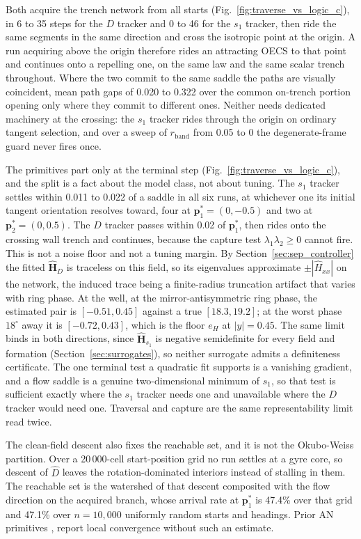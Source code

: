 \documentclass[lettersize,journal]{IEEEtran}
\begin{document}
Both acquire the trench network from all starts
(Fig.~\ref{fig:traverse_vs_logic_c}), in 6 to 35 steps for the $D$
tracker and 0 to 46 for the $s_1$ tracker, then ride the same segments
in the same direction and cross the isotropic point at the origin. A run acquiring above the origin therefore rides an attracting
OECS to that point and continues onto a repelling one, on the same law
and the same scalar trench throughout. Where the two commit to the same
saddle the paths are visually coincident, mean path gaps of 0.020 to
0.322 over the common on-trench portion opening only where they commit
to different ones. Neither needs dedicated machinery at the crossing:
the $s_1$ tracker rides through the origin on ordinary tangent
selection, and over a sweep of $r_{\text{band}}$ from 0.05 to 0 the
degenerate-frame guard never fires once.

The primitives part only at the terminal step
(Fig.~\ref{fig:traverse_vs_logic_c}), and the split is a fact about the
model class, not about tuning. The $s_1$ tracker
settles within 0.011 to 0.022 of a saddle in all six runs, at whichever one
its initial tangent orientation resolves toward, four at
$\mathbf{p}^*_1 = (0, -0.5)$ and two at $\mathbf{p}^*_2 = (0, 0.5)$. The
$D$ tracker passes within 0.02 of $\mathbf{p}^*_1$, then rides onto the
crossing wall trench and continues, because the capture test
$\lambda_1\lambda_2 \geq 0$ cannot fire. This
is not a noise floor and not a tuning margin. By
Section~\ref{sec:sep_controller} the fitted $\hat{\mathbf{H}}_D$ is
traceless on this field, so its eigenvalues approximate
$\pm|\hat{H}_{xx}|$ on the network, the induced trace being a
finite-radius truncation artifact that varies with ring phase. At the
well, at the mirror-antisymmetric ring phase, the estimated pair is
$[-0.51, 0.45]$ against a true $[18.3, 19.2]$; at the worst phase
$18^\circ$ away it is $[-0.72, 0.43]$, which is the floor $e_H$
at $|y| = 0.45$. The same
limit binds in both directions, since $\hat{\mathbf{H}}_{s_1}$ is
negative semidefinite for every field and formation
(Section~\ref{sec:surrogates}), so neither surrogate admits a definiteness
certificate. The one terminal test a quadratic fit supports is a
vanishing gradient, and a flow saddle is a genuine two-dimensional
minimum of $s_1$, so that test is sufficient exactly where the $s_1$
tracker needs one and unavailable where the $D$ tracker would need one.
Traversal and capture are the same representability limit read twice.

The clean-field descent also fixes the reachable set, and it is not the
Okubo-Weiss partition. Over a 20\,000-cell start-position grid no run
settles at a gyre core, so descent of $\hat{D}$ leaves the
rotation-dominated interiors instead of stalling in them. The
reachable set is the watershed of that descent composited with the flow
direction on the acquired branch, whose arrival rate at
$\mathbf{p}^*_1$ is 47.4\% over that grid and 47.1\% over $n =
10{,}000$ uniformly random starts and headings. Prior AN primitives
\cite{3}, \cite{2} report local convergence without such an estimate.
\end{document}
